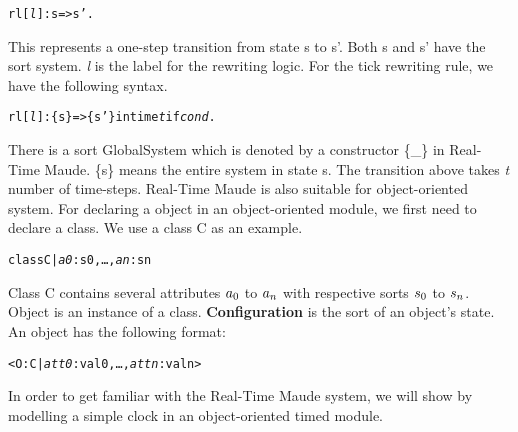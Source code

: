 \documentclass{report}
\begin{document}
\begin{alltt}   rl [\textit{l}] : s => s' .\end{alltt}
This represents a one-step transition from state s to s'. Both s and s' have the sort system. \textit{l} is the label for the rewriting logic. For the tick rewriting rule, we have the following syntax.
\begin{alltt}   rl [\textit{l}] : \{s\} => \{s'\} in time \textit{t} if \textit{cond} . \end{alltt}
There is a sort GlobalSystem which is denoted by a constructor \{\_\} in Real-Time Maude. \{s\} means the entire system in state s. The transition above takes \textit{t} number of time-steps. 
Real-Time Maude is also suitable for object-oriented system. For declaring a object in an object-oriented module, we first need to declare a class. We use a class C as an example.

\begin{alltt}
   class C | \textit{a0}: s0, \ldots, \textit{an} : sn
\end{alltt}
Class C contains several attributes $a\sb{0}$ to $a\sb{n}$ with respective sorts $s\sb{0}$ to $s\sb{n}$. 
\newline Object is an instance of a class. {\bf Configuration} is the sort of an object's state.  An object has the following format:
\begin{alltt}
   < O : C | \textit{att0} : val0, \ldots, \textit{attn} : valn >
\end{alltt}
In order to get familiar with the Real-Time Maude system, we will show by modelling a simple clock in an object-oriented timed module.
\newpage
\end{document}
